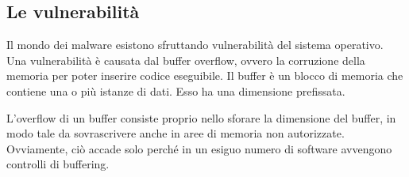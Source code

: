 \documentclass[a4paper]{article}
\begin{document}
\subsection{Le vulnerabilità}
Il mondo dei malware esistono sfruttando vulnerabilità del sistema operativo. Una vulnerabilità è causata dal buffer overflow, ovvero la corruzione della memoria per poter inserire codice eseguibile. Il buffer è un blocco di memoria che contiene una o più istanze di dati. Esso ha una dimensione prefissata.

L'overflow di un buffer consiste proprio nello sforare la dimensione del buffer, in modo tale da sovrascrivere anche in aree di memoria non autorizzate. Ovviamente, ciò accade solo perché in un esiguo numero di software avvengono controlli di buffering.
\end{document}

